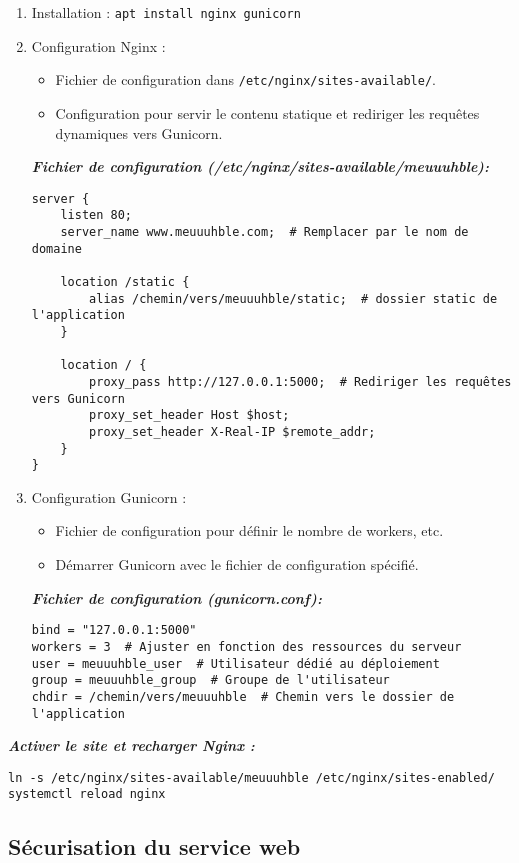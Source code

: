 \begin{enumerate}
	\item Installation : \texttt{apt install nginx gunicorn}
	\item Configuration Nginx : 
	\begin{itemize}
		\item Fichier de configuration dans \texttt{/etc/nginx/sites-available/}.
		\item Configuration pour servir le contenu statique et rediriger les requêtes dynamiques vers Gunicorn.
	\end{itemize}
\textit{\textbf{Fichier de configuration (/etc/nginx/sites-available/meuuuhble):}}
	\begin{lstlisting}[style=tf]
server {
	listen 80;
	server_name www.meuuuhble.com;  # Remplacer par le nom de domaine
	
	location /static {
		alias /chemin/vers/meuuuhble/static;  # dossier static de l'application
	}
	
	location / {
		proxy_pass http://127.0.0.1:5000;  # Rediriger les requêtes vers Gunicorn
		proxy_set_header Host $host;
		proxy_set_header X-Real-IP $remote_addr;
	}
}
	\end{lstlisting}
	
	\item Configuration Gunicorn :
	\begin{itemize}
		\item Fichier de configuration pour définir le nombre de workers, etc.
		\item Démarrer Gunicorn avec le fichier de configuration spécifié.
	\end{itemize}
\textit{\textbf{Fichier de configuration (gunicorn.conf):}}
	\begin{lstlisting}[style=tf]
bind = "127.0.0.1:5000"
workers = 3  # Ajuster en fonction des ressources du serveur
user = meuuuhble_user  # Utilisateur dédié au déploiement
group = meuuuhble_group  # Groupe de l'utilisateur
chdir = /chemin/vers/meuuuhble  # Chemin vers le dossier de l'application
	\end{lstlisting}
\end{enumerate}

\textbf{\textit{Activer le site et recharger Nginx :}}
\begin{lstlisting}
ln -s /etc/nginx/sites-available/meuuuhble /etc/nginx/sites-enabled/
systemctl reload nginx
\end{lstlisting}


\subsection{Sécurisation du service web}

